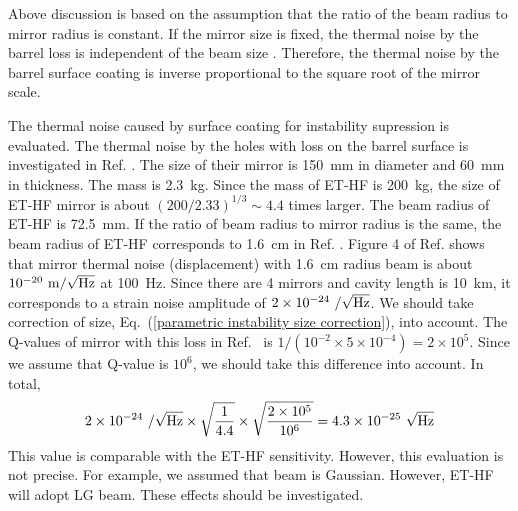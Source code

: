 Above discussion is based on the assumption that the ratio of the
beam radius to mirror radius is constant. If the mirror size is
fixed, the thermal noise by the barrel loss is independent of the beam size
\cite{Yamamoto2002}. Therefore, the thermal noise by the barrel
surface coating is inverse proportional to the square root of the
mirror scale.

The thermal noise caused by surface coating for instability supression is evaluated. The 
thermal noise by the holes with loss on the barrel surface is investigated in Ref. \cite{Gras2004}.
The size of their mirror is 150~mm in diameter and 60~mm in thickness. The mass is 2.3~kg. Since 
the mass of ET-HF is 200~kg, the size of ET-HF mirror is about $(200/2.33)^{1/3}\sim4.4$ times larger.
The beam radius of ET-HF is 72.5~mm. If the ratio of beam radius to mirror radius is the same, 
the beam radius of ET-HF corresponds to 1.6~cm in Ref. \cite{Gras2004}. Figure 4 of Ref. \cite{Gras2004} 
shows that mirror thermal noise (displacement) with 1.6~cm radius beam is about $10^{-20}~{\rm m/}\sqrt{\rm Hz}$ at 100~Hz. 
Since there are 4 mirrors and cavity length is 10~km, it corresponds to 
a strain noise amplitude of $2 \times 10^{-24}~/\sqrt{\rm Hz}$.
We should take correction of size, Eq.~(\ref{parametric instability size correction}), into account.  
The Q-values of mirror with this loss in Ref.~\cite{Gras2004} 
is $1/(10^{-2}\times5\times10^{-4})=2\times10^5$. Since we assume 
that Q-value is $10^{6}$, we should take this difference into account. In total,
\begin{equation}
2 \times 10^{-24}~/\sqrt{\rm Hz} \times \sqrt{\frac{1}{4.4}} \times \sqrt{\frac{2 \times 10^5}{10^6}} = 4.3 \times 10^{-25}~\sqrt{\rm Hz}
\end{equation}
This value is comparable with the ET-HF sensitivity. 
However, this evaluation is not precise. For example, we assumed that beam is Gaussian. 
However, ET-HF will adopt LG beam. These effects should be investigated. 




